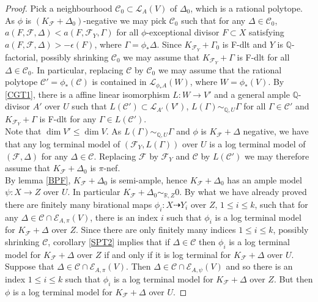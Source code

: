 \documentclass[12pt]{amsart}%
\theoremstyle{plain}
\theoremstyle{remark}
\theoremstyle{definition}
\newcommand{\<}{\leq}
\newcommand{\mbQ}{\mathbb{Q}}
\newcommand{\mbR}{\mathbb{R}}
\def\dim{\operatorname{dim}}
\theoremstyle{definition}
\theoremstyle{definition}
\numberwithin{equation}{section}
\theoremstyle{remark}
\begin{document}
\begin{proof}
Pick a neighbourhood $\mathcal{C}_0\subset \mathcal{L}_A(V)$ of $\Delta_0$, which is a rational polytope. As $\phi$ is $(K_{\mathcal{F}}+\Delta_0)$-negative we may pick $\mathcal{C}_0$ such that for any $\Delta\in\mathcal{C}_0$, $a(F,\mathcal{F},\Delta)<a(F,\mathcal{F}_Y,\Gamma)$ for all $\phi$-exceptional divisor $F\subset X$ satisfying $a(F,\mathcal{F},\Delta)>-\epsilon(F)$, where $\Gamma=\phi_*\Delta$. Since $K_{\mathcal{F}_Y}+\Gamma_0$ is F-dlt and $Y$ is $\mbQ$-factorial, possibly shrinking $\mathcal{C}_0$ we may assume that $K_{\mathcal{F}_Y}+\Gamma$ is F-dlt for all $\Delta\in \mathcal{C}_0$. In particular, replacing $\mathcal{C}$ by $\mathcal{C}_0$ we may assume that the rational polytope $\mathcal{C}'=\phi_*(\mathcal{C})$ is contained in $\mathcal{L}_{\phi_* A}(W)$, where $W=\phi_*(V)$. By \ref{CGT1}, there is a affine linear isomorphism $L:W\rightarrow V'$ and a general ample $\mbQ$-divisor $A'$ over $U$ such that $L(\mathcal{C}')\subset \mathcal{L}_{A'}(V')$, $L(\Gamma)\sim_{\mbQ,U}\Gamma$ for all $\Gamma\in \mathcal{C}'$ and $K_{\mathcal{F}_Y}+\Gamma$ is F-dlt for any $\Gamma\in L(\mathcal{C}')$.\\
Note that $\dim V'\leqslant \dim V$. As $L(\Gamma)\sim_{\mbQ,U}\Gamma$ and $\phi$ is $K_{\mathcal{F}}+\Delta$ negative, we have that any log terminal model of $(\mathcal{F}_Y,L(\Gamma))$ over $U$ is a log terminal model of $(\mathcal{F},\Delta)$ for any $\Delta\in \mathcal{C}$. Replacing $\mathcal{F}$ by $\mathcal{F}_Y$ and $\mathcal{C}$ by $L(\mathcal{C}')$ we may therefore assume that $K_{\mathcal{F}}+\Delta_0$ is $\pi$-nef.\\
By lemma \ref{BPF}, $K_{\mathcal{F}}+\Delta_0$ is semi-ample, hence $K_{\mathcal{F}}+\Delta_0$ has an ample model $\psi:X\rightarrow Z$ over $U$. In particular $K_{\mathcal{F}}+\Delta_0\sim_{\mbR,Z} 0$. By what we have already proved there are finitely many birational maps $\phi_i:X\dashrightarrow Y_i$ over $Z$, $1\leqslant i\leqslant k$, such that for any $\Delta\in \mathcal{C}\cap \mathcal{E}_{A,\pi}(V)$, there is an index $i$ such that $\phi_i$ is a log terminal model for $K_{\mathcal{F}}+\Delta$ over $Z$. Since there are only finitely many indices $1\leqslant i\leqslant k$, possibly shrinking $\mathcal{C}$, corollary \ref{SPT2} implies that if $\Delta\in \mathcal{C}$ then $\phi_i$ is a log terminal model for $K_{\mathcal{F}}+\Delta$ over $Z$ if and only if it is log terminal for $K_{\mathcal{F}}+\Delta$ over $U$. Suppose that $\Delta\in \mathcal{C}\cap \mathcal{E}_{A,\pi}(V)$. Then $\Delta\in \mathcal{C}\cap \mathcal{E}_{A,\psi}(V)$ and so there is an index $1\leqslant i\leqslant k$ such that $\phi_i$ is a log terminal model for $K_{\mathcal{F}}+\Delta$ over $Z$. But then $\phi$ is a log terminal model for $K_{\mathcal{F}}+\Delta$ over $U$.










    
\end{proof}
\end{document}
